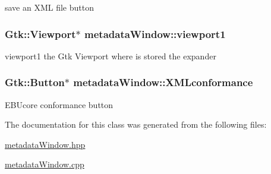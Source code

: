save an X\-M\-L file button \hypertarget{classmetadataWindow_abcf0f3fc4cc9c73b68edbfef1d755a38}{
\subsubsection[{viewport1}]{\setlength{\rightskip}{0pt plus 5cm}Gtk\-::\-Viewport$\ast$ metadata\-Window\-::viewport1\hspace{0.3cm}{\ttfamily [protected]}}}\label{classmetadataWindow_abcf0f3fc4cc9c73b68edbfef1d755a38}
viewport1 the Gtk Viewport where is stored the expander \hypertarget{classmetadataWindow_ae95b4bc0b7741686138e6fcad39f05c2}{
\subsubsection[{X\-M\-Lconformance}]{\setlength{\rightskip}{0pt plus 5cm}Gtk\-::\-Button$\ast$ metadata\-Window\-::\-X\-M\-Lconformance\hspace{0.3cm}{\ttfamily [protected]}}}\label{classmetadataWindow_ae95b4bc0b7741686138e6fcad39f05c2}
E\-B\-Ucore conformance button 

The documentation for this class was generated from the following files\-:\begin{DoxyCompactItemize}
\item 
\hyperlink{metadataWindow_8hpp}{metadata\-Window.\-hpp}\item 
\hyperlink{metadataWindow_8cpp}{metadata\-Window.\-cpp}\end{DoxyCompactItemize}
